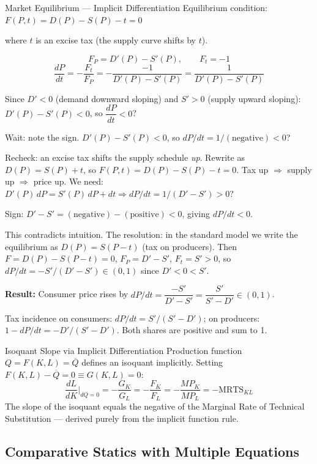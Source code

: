 \documentclass[12pt, a4paper]{article}
\theoremstyle{definition}
\newcommand{\ddd}[2]{\dfrac{d#1}{d#2}}
\begin{document}
\begin{exbox}{Market Equilibrium --- Implicit Differentiation}
Equilibrium condition: $F(P, t) = D(P) - S(P) - t = 0$

where $t$ is an excise tax (the supply curve shifts by $t$).

\[
  F_P = D'(P) - S'(P), \qquad F_t = -1
\]
\[
  \ddd{P}{t} = -\frac{F_t}{F_P} = -\frac{-1}{D'(P)-S'(P)}
             = \frac{1}{D'(P)-S'(P)}
\]

Since $D'<0$ (demand downward sloping) and $S'>0$ (supply upward sloping):
$D'(P) - S'(P) < 0$, so $\dfrac{dP}{dt} < 0$?

Wait: note the sign. $D'(P)-S'(P) < 0$, so $dP/dt = 1/(\text{negative}) < 0$?

Recheck: an excise tax shifts the supply schedule \emph{up}.  Rewrite as
$D(P)=S(P)+t$, so $F(P,t)=D(P)-S(P)-t=0$.
Tax up $\Rightarrow$ supply up $\Rightarrow$ price up.
We need: $D'(P)\,dP = S'(P)\,dP + dt \Rightarrow dP/dt = 1/(D'-S') > 0$?

Sign: $D' - S' = (\text{negative}) - (\text{positive}) < 0$, giving $dP/dt < 0$.

This contradicts intuition.  The resolution: in the standard model we write
the equilibrium as $D(P) = S(P-t)$ (tax on producers).  Then
$F = D(P) - S(P-t) = 0$, $F_P = D'-S'$, $F_t = S' > 0$, so
$dP/dt = -S'/(D'-S') \in (0,1)$ since $D'<0<S'$.

\textbf{Result:} Consumer price rises by $dP/dt = \dfrac{-S'}{D'-S'}
= \dfrac{S'}{S'-D'} \in (0,1)$.

Tax incidence on consumers: $dP/dt = S'/(S'-D')$; on producers:
$1-dP/dt = -D'/(S'-D')$.  Both shares are positive and sum to 1.
\end{exbox}

\begin{exbox}{Isoquant Slope via Implicit Differentiation}
Production function $Q = F(K,L) = \overline{Q}$ defines an isoquant
implicitly.  Setting $F(K,L) - \overline{Q} = 0 \equiv G(K,L) = 0$:
\[
  \ddd{L}{K}\bigg|_{dQ=0} = -\frac{G_K}{G_L}
  = -\frac{F_K}{F_L}
  = -\frac{MP_K}{MP_L}
  = -\text{MRTS}_{KL}
\]
The slope of the isoquant equals the negative of the Marginal Rate of
Technical Substitution --- derived purely from the implicit function rule.
\end{exbox}

\subsection{Comparative Statics with Multiple Equations}
\end{document}

